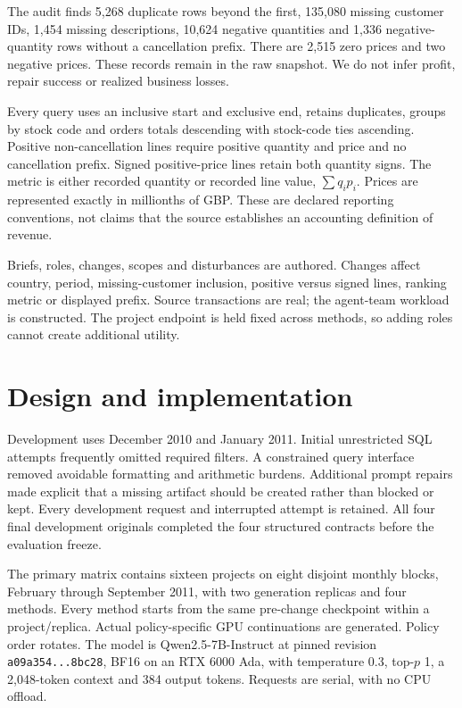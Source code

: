 \documentclass[10pt]{article}
\begin{document}
The audit finds 5,268 duplicate rows beyond the first, 135,080 missing customer IDs, 1,454 missing descriptions, 10,624 negative quantities and 1,336 negative-quantity rows without a cancellation prefix. There are 2,515 zero prices and two negative prices. These records remain in the raw snapshot. We do not infer profit, repair success or realized business losses.

Every query uses an inclusive start and exclusive end, retains duplicates, groups by stock code and orders totals descending with stock-code ties ascending. Positive non-cancellation lines require positive quantity and price and no cancellation prefix. Signed positive-price lines retain both quantity signs. The metric is either recorded quantity or recorded line value, $\sum q_i p_i$. Prices are represented exactly in millionths of GBP. These are declared reporting conventions, not claims that the source establishes an accounting definition of revenue.

Briefs, roles, changes, scopes and disturbances are authored. Changes affect country, period, missing-customer inclusion, positive versus signed lines, ranking metric or displayed prefix. Source transactions are real; the agent-team workload is constructed. The project endpoint is held fixed across methods, so adding roles cannot create additional utility.

\section{Design and implementation}
Development uses December 2010 and January 2011. Initial unrestricted SQL attempts frequently omitted required filters. A constrained query interface removed avoidable formatting and arithmetic burdens. Additional prompt repairs made explicit that a missing artifact should be created rather than blocked or kept. Every development request and interrupted attempt is retained. All four final development originals completed the four structured contracts before the evaluation freeze.

The primary matrix contains sixteen projects on eight disjoint monthly blocks, February through September 2011, with two generation replicas and four methods. Every method starts from the same pre-change checkpoint within a project/replica. Actual policy-specific GPU continuations are generated. Policy order rotates. The model is Qwen2.5-7B-Instruct at pinned revision \texttt{a09a354...8bc28}, BF16 on an RTX 6000 Ada, with temperature 0.3, top-$p$ 1, a 2,048-token context and 384 output tokens. Requests are serial, with no CPU offload.
\end{document}
